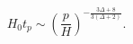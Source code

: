 \begin{equation}
H_0 t_p \sim  \left( \frac{p}{H} \right)^{-\frac{3 \Delta+8}{3(\Delta+2)}}.
\end{equation}

